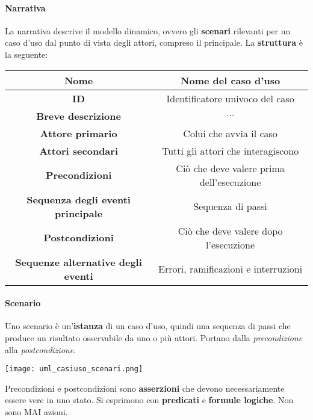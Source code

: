\paragraph{Narrativa}
La narrativa descrive il modello dinamico, ovvero gli \textbf{scenari} rilevanti per un caso d'uso dal punto di vista degli attori, compreso il principale. La \textbf{struttura} è la seguente:
\begin{table}[!h]
	\centering
	\begin{tabular}{|c|c|}
		\hline
		\textbf{Nome} & Nome del caso d'uso\\
		\hline
		\textbf{ID} & Identificatore univoco del caso \\
		\hline
		\textbf{Breve descrizione} & $\ldots$\\
		\hline
		\textbf{Attore primario} & Colui che avvia il caso \\
		\hline
		\textbf{Attori secondari} & Tutti gli attori che interagiscono \\
		\hline
		\textbf{Precondizioni} & Ciò che deve valere prima dell'esecuzione\\
		\hline
		\textbf{Sequenza degli eventi principale} & Sequenza di passi \\
		\hline
		\textbf{Postcondizioni} & Ciò che deve valere dopo l'esecuzione \\
		\hline
		\textbf{Sequenze alternative degli eventi} & Errori, ramificazioni e interruzioni\\
		\hline
	\end{tabular}
\end{table}

\paragraph{Scenario}
Uno scenario è un'\textbf{istanza} di un caso d'uso, quindi una sequenza di passi che produce un risultato osservabile da uno o più attori. Portano dalla \textit{precondizione} alla \textit{postcondizione}.
\begin{center}
	\texttt{[image: uml\_casiuso\_scenari.png]}
\end{center}

\begin{definition}
	Precondizioni e postcondizioni sono \textbf{asserzioni} che devono necessariamente essere vere in uno stato. Si esprimono con \textbf{predicati} e \textbf{formule logiche}. \color{red} Non sono MAI azioni. \color{black}
\end{definition}

